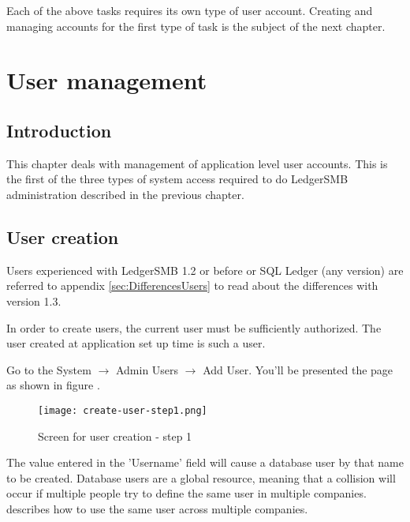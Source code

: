 Each of the above tasks requires its own type of user account. Creating and managing accounts
for the first type of task is the subject of the next chapter.




\chapter{User management}
\label{cha-user-management}

\section{Introduction}

This chapter deals with management of application level user accounts. This is the first
of the three types of system access required to do LedgerSMB administration described in
the previous chapter.

\section{User creation}
\label{sec-user-creation}

Users experienced with LedgerSMB 1.2 or before or SQL Ledger (any version) are
referred to appendix \ref{sec:DifferencesUsers} to read about the differences
with version 1.3.

In order to create users, the current user must be sufficiently authorized. The user
created at application set up time is such a user.

Go to the System $\rightarrow$ Admin Users $\rightarrow$ Add User. You'll be presented the page as shown in figure .

\begin{figure}[h]
\texttt{[image: create-user-step1.png]}
\caption{Screen for user creation - step 1}
\end{figure}
\label{fig:create-user-step1}

The value entered in the 'Username' field will cause a database user by that name
to be created. Database users are a global resource, meaning that a collision will
occur if multiple people try to define the same user in multiple companies.
 describes how to use the same user across multiple companies.

